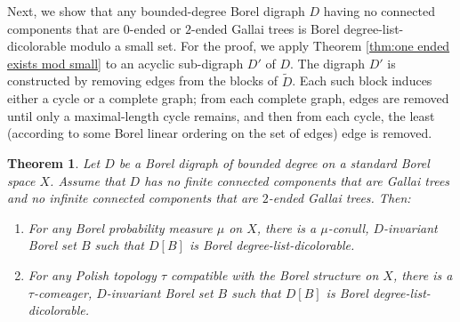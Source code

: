 \documentclass[psamsfonts]{amsart}
\newtheorem{thm}{Theorem}[section]
\theoremstyle{definition}
\theoremstyle{remark}
\numberwithin{equation}{section}
\begin{document}
Next, we show that any bounded-degree Borel digraph $D$ having no connected components that are $0$-ended or $2$-ended Gallai trees is Borel degree-list-dicolorable modulo a small set. For the proof, we apply Theorem \ref{thm:one ended exists mod small} to an acyclic sub-digraph $D'$ of $D$. The digraph $D'$ is constructed by removing edges from the blocks of $\tilde{D}$. Each such block induces either a cycle or a complete graph; from each complete graph, edges are removed until only a maximal-length cycle remains, and then from each cycle, the least (according to some Borel linear ordering on the set of edges) edge is removed.

\begin{thm}
\label{thm:one ended gallai trees}
    Let $D$ be a Borel digraph of bounded degree on a standard Borel space $X$. Assume that $D$ has no finite connected components that are Gallai trees and no infinite connected components that are $2$-ended Gallai trees. Then:
    \begin{enumerate}
        \item For any Borel probability measure $\mu$ on $X$, there is a $\mu$-conull, $D$-invariant Borel set $B$ such that $D[B]$ is Borel degree-list-dicolorable.
        \item For any Polish topology $\tau$ compatible with the Borel structure on $X$, there is a $\tau$-comeager, $D$-invariant Borel set $B$ such that $D[B]$ is Borel degree-list-dicolorable.
    \end{enumerate}
\end{thm}
\end{document}
